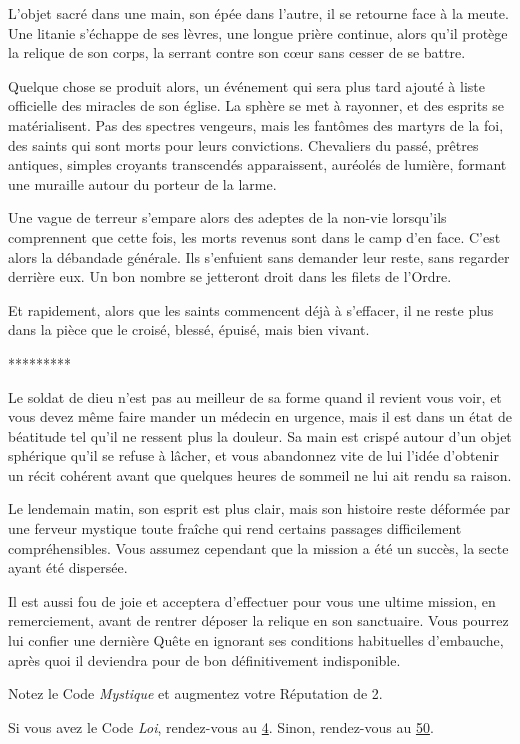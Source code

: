 \documentclass{report}
\newcommand{\glink}[1]{\hyperref[section-#1]{#1}}
\newcommand{\ellipse}{
    \begin{center}
        *********
    \end{center}
}
\begin{document}
L'objet sacré dans une main, son épée dans l'autre, il se retourne face à la meute. Une litanie s'échappe de ses lèvres, une longue prière continue, alors qu'il protège la relique de son corps, la serrant contre son cœur sans cesser de se battre.

Quelque chose se produit alors, un événement qui sera plus tard ajouté à liste officielle des miracles de son église. La sphère se met à rayonner, et des esprits se matérialisent. Pas des spectres vengeurs, mais les fantômes des martyrs de la foi, des saints qui sont morts pour leurs convictions. Chevaliers du passé, prêtres antiques, simples croyants transcendés apparaissent, auréolés de lumière, formant une muraille autour du porteur de la larme.

Une vague de terreur s'empare alors des adeptes de la non-vie lorsqu'ils comprennent que cette fois, les morts revenus sont dans le camp d'en face. C'est alors la débandade générale. Ils s'enfuient sans demander leur reste, sans regarder derrière eux. Un bon nombre se jetteront droit dans les filets de l'Ordre.

Et rapidement, alors que les saints commencent déjà à s'effacer, il ne reste plus dans la pièce que le croisé, blessé, épuisé, mais bien vivant.

\ellipse

Le soldat de dieu n'est pas au meilleur de sa forme quand il revient vous voir, et vous devez même faire mander un médecin en urgence, mais il est dans un état de béatitude tel qu'il ne ressent plus la douleur. Sa main est crispé autour d'un objet sphérique qu'il se refuse à lâcher, et vous abandonnez vite de lui l'idée d'obtenir un récit cohérent avant que quelques heures de sommeil ne lui ait rendu sa raison.

Le lendemain matin, son esprit est plus clair, mais son histoire reste déformée par une ferveur mystique toute fraîche qui rend certains passages difficilement compréhensibles. Vous assumez cependant que la mission a été un succès, la secte ayant été dispersée.

Il est aussi fou de joie et acceptera d'effectuer pour vous une ultime mission, en remerciement, avant de rentrer déposer la relique en son sanctuaire. Vous pourrez lui confier une dernière Quête en ignorant ses conditions habituelles d'embauche, après quoi il deviendra pour de bon définitivement indisponible.

Notez le Code \emph{Mystique} et augmentez votre Réputation de 2.

Si vous avez le Code \emph{Loi}, rendez-vous au \glink{4}. Sinon, rendez-vous au \glink{50}.
\end{document}
